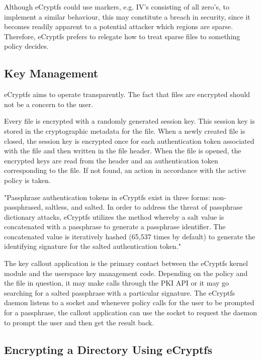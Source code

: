 Although eCryptfs could use markers, e.g. IV's consisting of all zero's, to implement a similar behaviour, this may constitute a breach in security, since it becomes readily apparent to a potential attacker which regions are sparse.
Therefore, eCryptfs prefers to relegate how to treat sparse files to something policy decides.

\subsection{Key Management}
\label{sub-sec:keys-ecryptfs}

eCryptfs aims to operate transparently. The fact that files are encrypted should not be a concern to the user.

Every file is encrypted with a randomly generated session key. This session key is stored in the cryptographic metadata for the file. When a newly created file is closed, the session key is encrypted once for each authentication token associated with the file and then written in the file header. When the file is opened, the encrypted keys are read from the header and an authentication token corresponding to the file. If not found, an action in accordance with the active policy is taken.

"Passphrase authentication tokens in eCryptfs exist in three forms: non-passphrased, saltless, and salted. In order to address the threat of passphrase dictionary attacks, eCryptfs utilizes the method whereby a salt value is concatenated with a passphrase to generate a passphrase identifier. The concatenated value is iteratively hashed (65,537 times by default) to generate the identifying signature for the salted authentication token\cite{ecryptfs-paper}."

The key callout application is the primary contact between the eCryptfs kernel module and the userspace key management code. Depending on the policy and the file in question, it may make calls through the PKI API or it may go searching for a salted passphrase with a particular signature. The eCryptfs daemon listens to a socket and whenever policy calls for the user to be prompted for a passphrase, the callout application can use the socket to request the daemon to prompt the user and then get the result back.

\subsection{Encrypting a Directory Using eCryptfs}
\label{sub-sec:encrypt-dir-ecryptfs}

